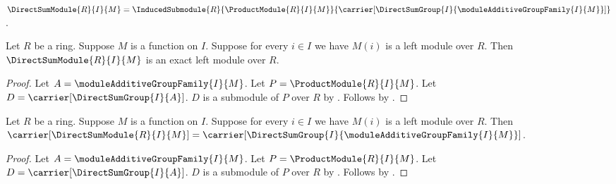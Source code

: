 \begin{definition}\label{direct_sum_module}
    $\DirectSumModule{R}{I}{M}
        =\InducedSubmodule{R}{\ProductModule{R}{I}{M}}{
            \carrier[\DirectSumGroup{I}{
                \moduleAdditiveGroupFamily{I}{M}}]}$.
\end{definition}

\begin{theorem}\label{direct_sum_module_is_exact}
    Let $R$ be a ring.
    Suppose $M$ is a function on $I$.
    Suppose for every $i\in I$ we have $M(i)$ is a left module over $R$.
    Then $\DirectSumModule{R}{I}{M}$
        is an exact left module over $R$.
\end{theorem}
\begin{proof}
    Let $A=\moduleAdditiveGroupFamily{I}{M}$.
    Let $P=\ProductModule{R}{I}{M}$.
    Let $D=\carrier[\DirectSumGroup{I}{A}]$.
    $D$ is a submodule of $P$ over $R$ by
        .
    Follows by
        .
\end{proof}

\begin{proposition}\label{direct_sum_module_carrier}
    Let $R$ be a ring.
    Suppose $M$ is a function on $I$.
    Suppose for every $i\in I$ we have $M(i)$ is a left module over $R$.
    Then
        $\carrier[\DirectSumModule{R}{I}{M}]
            =\carrier[\DirectSumGroup{I}{
                \moduleAdditiveGroupFamily{I}{M}}]$.
\end{proposition}
\begin{proof}
    Let $A=\moduleAdditiveGroupFamily{I}{M}$.
    Let $P=\ProductModule{R}{I}{M}$.
    Let $D=\carrier[\DirectSumGroup{I}{A}]$.
    $D$ is a submodule of $P$ over $R$ by
        .
    Follows by
        .
\end{proof}


